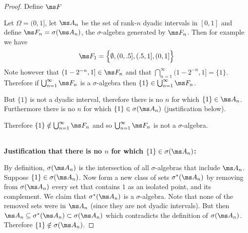 \begin{enumerate}
\begin{enumerate}[label=(\alph*)]




    \begin{proof}


      Define $\ms F$

      Let $\Omega = (0, 1]$, let $\ms A_n$ be the set of rank-$n$ dyadic intervals in $[0, 1]$ and
      define $\ms F_n = \sigma(\ms A_n)$, the $\sigma$-algebra generated by $\ms F_n$. Then for example we have
      \begin{align*}
        \ms F_1 &= \Big\{\emptyset,
                         (0, .5], (.5, 1],
                         (0, 1]
                   \Big\} \\
      \end{align*}
      Note however that $(1 - 2^{-n}, 1] \in \ms F_n$ and that $\bigcap_{n=1}^\infty (1 - 2^{-n}, 1] = \{1\}$.
      Therefore if $\bigcup_{n=1}^\infty \ms F_n$ is a $\sigma$-algebra
      then $\{1\} \in \bigcup_{n=1}^\infty \ms F_n$.

      But $\{1\}$ is not a dyadic interval, therefore there is no $n$ for which $\{1\} \in \ms A_n$.
      Furthermore there is no $n$ for which $\{1\} \in \sigma(\ms A_n)$ (justification below).

      Therefore $\{1\} \notin \bigcup_{n=1}^\infty \ms F_n$ and so $\bigcup_{n=1}^\infty \ms F_n$ is not a $\sigma$-algebra.

      ~\\
      \textbf{Justification that there is no $n$ for which $\{1\} \in \sigma(\ms A_n)$:}

      By definition, $\sigma(\ms A_n)$ is the intersection of all $\sigma$-algebras that include $\ms A_n$.
      Suppose $\{1\} \in \sigma(\ms A_n)$. Now form a new class of sets $\sigma^*(\ms A_n)$ by removing
      from $\sigma(\ms A_n)$ every set that contains $1$ as an isolated point, and its complement. We claim
      that $\sigma^*(\ms A_n)$ is a $\sigma$-algebra. Note that none of the removed sets were in $\ms A_n$
      (since they are not dyadic intervals). But
      then $\ms A_n \subseteq \sigma^*(\ms A_n) \subset \sigma(\ms A_n)$ which contradicts the definition
      of $\sigma(\ms A_n)$. Therefore $\{1\} \notin \sigma(\ms A_n)$.
    \end{proof}
  \end{enumerate}


\end{enumerate}
